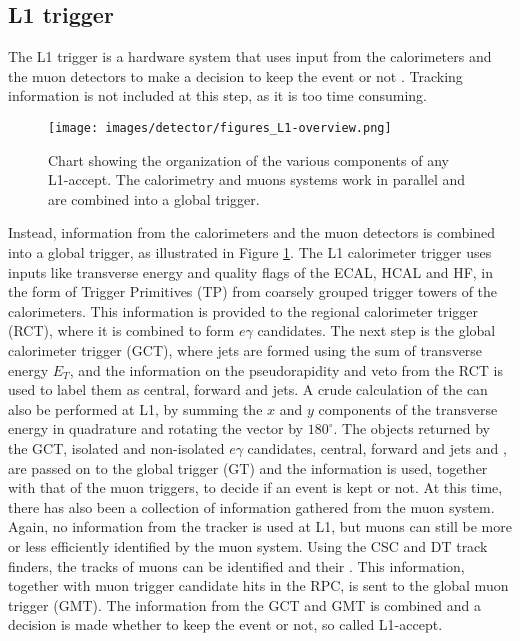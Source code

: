 \subsection*{L1 trigger}
\noindent
\justify
The L1 trigger is a hardware system that uses input from the calorimeters and the muon detectors to make a decision to keep the event or not \cite{Khachatryan:2016bia}. 
Tracking information is not included at this step, as it is too time consuming. 
\begin{figure}[!htp]
  \centering
   \texttt{[image: images/detector/figures\_L1-overview.png]}
   \caption{Chart showing the organization of the various components of any L1-accept. The calorimetry and muons systems work in parallel and are combined into a global trigger.}
   \label{fig:L1}
\end{figure}                                                                           
Instead, information from the calorimeters and the muon detectors is combined into a global trigger, as illustrated in Figure \ref{fig:L1}. 
The L1 calorimeter trigger uses inputs like transverse energy and quality flags of the ECAL, HCAL and HF, in the form of Trigger Primitives (TP) from coarsely grouped trigger towers of the calorimeters.
This information is provided to the regional calorimeter trigger (RCT), where it is combined to form $e\gamma$ candidates. 
The next step is the global calorimeter trigger (GCT), where jets are formed using the sum of transverse energy $E_{T}$, and the information on the pseudorapidity and \Tau veto from the RCT is used to label them as central, forward and \Tau jets. 
A crude calculation of the \ptmiss can also be performed at L1, by summing the $x$ and $y$ components of the transverse energy in quadrature and rotating the vector by $180^{\circ}$. 
The objects returned by the GCT, isolated and non-isolated $e\gamma$ candidates, central, forward and \Tau jets and \ptmiss, are passed on to the global trigger (GT) and the information is used, together with that of the muon triggers, to decide if an event is kept or not.   
At this time, there has also been a collection of information gathered from the muon system. 
Again, no information from the tracker is used at L1, but muons can still be more or less efficiently identified by the muon system. 
Using the CSC and DT track finders, the tracks of muons can be identified and their \pt. 
This information, together with muon trigger candidate hits in the RPC, is sent to the global muon trigger (GMT). 
The information from the GCT and GMT is combined and a decision is made whether to keep the event or not, so called L1-accept. 

